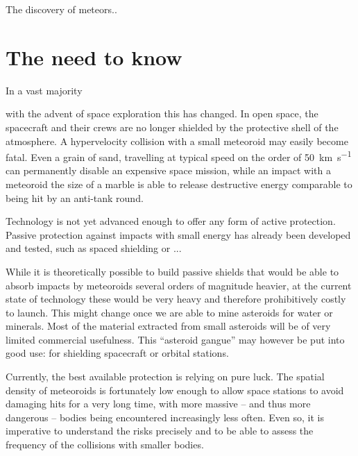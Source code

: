 
The discovery of meteors..


\section{The need to know}
    In a vast majority

    with the advent of space exploration this has changed. In open space, the spacecraft and their crews are no longer shielded
    by the protective shell of the atmosphere. A hypervelocity collision with a small meteoroid may easily become fatal.
    Even a grain of sand, travelling at typical speed on the order of \SI{50}{\kilo\metre\per\second} can permanently disable
    an expensive space mission, while an impact with a meteoroid the size of a marble is able to release
    destructive energy comparable to being hit by an anti-tank round.

    Technology is not yet advanced enough to offer any form of active protection.
    Passive protection against impacts with small energy has already been developed and tested,
    such as spaced shielding \cite{...} or ...

    While it is theoretically possible to build passive shields that would be able to absorb impacts
    by meteoroids several orders of magnitude heavier, at the current state of technology these would
    be very heavy and therefore prohibitively costly to launch.
    This might change once we are able to mine asteroids for water or minerals.
    Most of the material extracted from small asteroids will be of very limited commercial usefulness.
    This ``asteroid gangue'' may however be put into good use: for shielding spacecraft or orbital stations.

    Currently, the best available protection is relying on pure luck. The spatial density of meteoroids is
    fortunately low enough to allow space stations to avoid damaging hits for a very long time,
    with more massive -- and thus more dangerous -- bodies being encountered increasingly less often.
    Even so, it is imperative to understand the risks precisely and to be able to assess the frequency
    of the collisions with smaller bodies.

